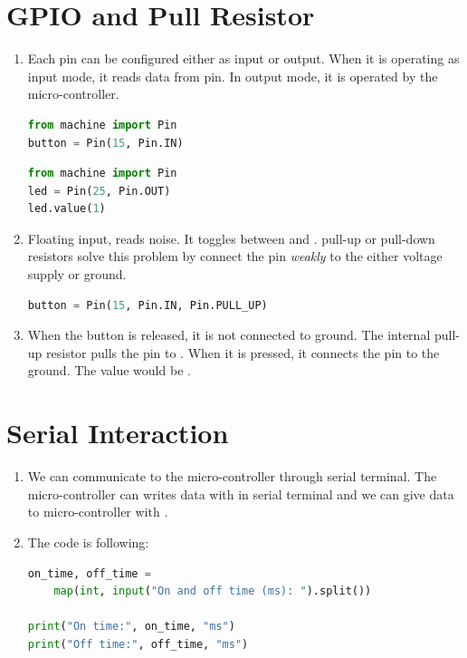 \documentclass[12pt]{article}
\begin{document}
	
	\newpage
	\pagestyle{fancy}
	\fancyhf{}
	\cfoot{\thepage}
	


	
	
	\section{GPIO and Pull Resistor}
	\begin{enumerate}[label = \alph*)]
		\item 
			Each pin can be configured either as input or output. When it is operating as input mode, it reads data from pin. In output mode, it is operated by the micro-controller.
			\begin{lstlisting}[language=Python]
from machine import Pin
button = Pin(15, Pin.IN)
			\end{lstlisting}
		
			\begin{lstlisting}[language=Python]
from machine import Pin
led = Pin(25, Pin.OUT)
led.value(1)   
		\end{lstlisting}
		\item 
			Floating input, reads noise. It toggles between  and . pull-up or pull-down resistors solve this problem by connect the pin \textit{weakly} to the either voltage supply or ground. 
			\begin{lstlisting}[language=Python]
button = Pin(15, Pin.IN, Pin.PULL_UP)
			\end{lstlisting}
			
			\item 
			When the button is released, it is not connected to ground. The internal pull-up resistor pulls the pin to .
			When it is pressed, it connects the pin to the ground. The value would be .
	\end{enumerate}
	
	\section{Serial Interaction}
	\begin{enumerate}[label = \alph*)]
		\item 
		We can communicate to the micro-controller through serial terminal. The micro-controller can writes data with  in serial terminal and we can give data to micro-controller with .
		\item  The code is following: \newline
		\begin{lstlisting}[language=Python]
on_time, off_time = 
	map(int, input("On and off time (ms): ").split())

print("On time:", on_time, "ms")
print("Off time:", off_time, "ms")
		\end{lstlisting}
	\end{enumerate}
	
\end{document}
